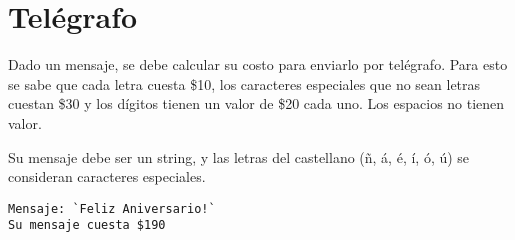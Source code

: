 \section{Telégrafo}

Dado un mensaje, se debe calcular su costo para enviarlo por telégrafo.
Para esto se sabe que cada letra cuesta \$10, los caracteres especiales
que no sean letras cuestan \$30 y los dígitos tienen un valor de \$20
cada uno. Los espacios no tienen valor.

Su mensaje debe ser un string, y las letras del castellano (ñ, á, é, í,
ó, ú) se consideran caracteres especiales.

\begin{lstlisting}[language=testcase]
Mensaje: `Feliz Aniversario!`
Su mensaje cuesta $190
\end{lstlisting}
